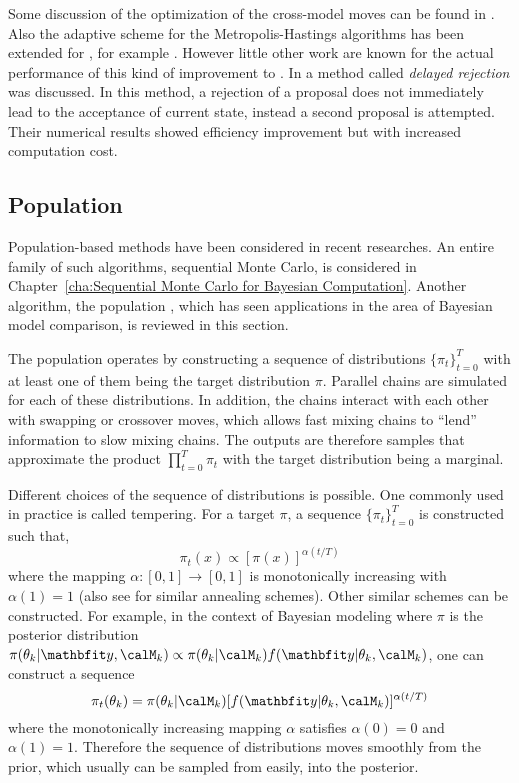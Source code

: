 Some discussion of the optimization of the cross-model moves can be found in
\cite{Green:2009tr}. Also the adaptive scheme for the Metropolis-Hastings
algorithms has been extended for \rjmcmc, for example \cite{Hastie:2005vi}.
However little other work are known for the actual performance of this kind
of improvement to \rjmcmc. In \cite{Green:2001tk} a method called
\emph{delayed rejection} was discussed. In this method, a rejection of a
proposal does not immediately lead to the acceptance of current state,
instead a second proposal is attempted. Their numerical results showed
efficiency improvement but with increased computation cost.

\subsection{Population \protect\mcmc}
\label{sub:Population mcmc}

Population-based methods have been considered in recent researches. An entire
family of such algorithms, sequential Monte Carlo, is considered in
Chapter~\ref{cha:Sequential Monte Carlo for Bayesian Computation}. Another
algorithm, the population \mcmc, which has seen applications in the area of
Bayesian model comparison, is reviewed in this section.

The population \mcmc operates by constructing a sequence of distributions
$\{\pi_t\}_{t=0}^T$ with at least one of them being the target distribution
$\pi$. Parallel \mcmc chains are simulated for each of these distributions. In
addition, the chains interact with each other with swapping or crossover
moves, which allows fast mixing chains to ``lend'' information to slow mixing
chains. The outputs are therefore samples that approximate the product
$\prod_{t=0}^T\pi_t$ with the target distribution being a marginal.

Different choices of the sequence of distributions is possible. One commonly
used in practice is called tempering. For a target $\pi$, a sequence
$\{\pi_t\}_{t=0}^T$ is constructed such that,
\begin{equation}
  \pi_t(x) \propto [\pi(x)]^{\alpha(t/T)}
\end{equation}
where the mapping $\alpha:[0,1]\to[0,1]$ is monotonically increasing with
$\alpha(1) = 1$ (also see \cite{Marinari:1992vx} for similar annealing
schemes). Other similar schemes can be constructed. For example, in the
context of Bayesian modeling where $\pi$ is the posterior distribution
$\pi(\theta_k|\data,\calM_k) \propto
\pi(\theta_k|\calM_k)f(\data|\theta_k,\calM_k)$, one can construct a sequence
\begin{equation}
  \pi_t(\theta_k) =
  \pi(\theta_k|\calM_k)[f(\data|\theta_k,\calM_k)]^{\alpha(t/T)}
  \label{eq:power post}
\end{equation}
where the monotonically increasing mapping $\alpha$ satisfies $\alpha(0) = 0$
and $\alpha(1) = 1$. Therefore the sequence of distributions moves smoothly
from the prior, which usually can be sampled from easily, into the posterior.

